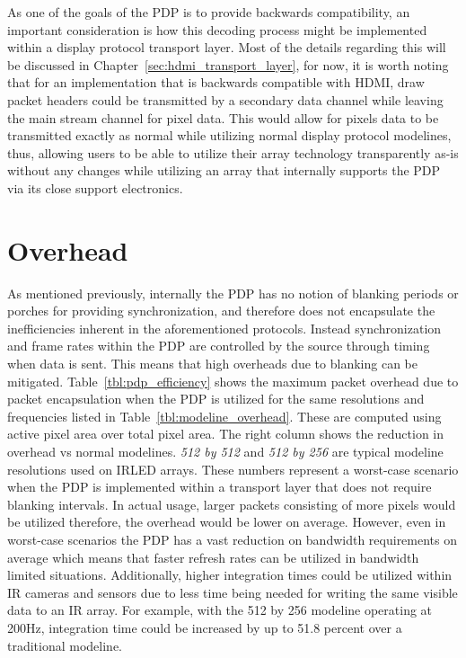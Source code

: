     As one of the goals of the PDP is to provide backwards compatibility, an important consideration is how this decoding process might be implemented within a display protocol transport layer. Most of the details regarding this will be discussed in Chapter~\ref{sec:hdmi_transport_layer}, for now, it is worth noting that for an implementation that is backwards compatible with HDMI, draw packet headers could be transmitted by a secondary data channel while leaving the main stream channel for pixel data. This would allow for pixels data to be transmitted exactly as normal while utilizing normal display protocol modelines, thus, allowing users to be able to utilize their array technology transparently as-is without any changes while utilizing an array that internally supports the PDP via its close support electronics.

\section{Overhead}
    As mentioned previously, internally the PDP has no notion of blanking periods or porches for providing synchronization, and therefore does not encapsulate the inefficiencies inherent in the aforementioned protocols. Instead synchronization and frame rates within the PDP are controlled by the source through timing when data is sent. This means that high overheads due to blanking can be mitigated. Table~\ref{tbl:pdp_efficiency} shows the maximum packet overhead due to packet encapsulation when the PDP is utilized for the same resolutions and frequencies listed in Table~\ref{tbl:modeline_overhead}. These are computed using active pixel area over total pixel area. The right column shows the reduction in overhead vs normal modelines. {\it 512 by 512} and {\it 512 by 256} are typical modeline resolutions used on IRLED arrays. These numbers represent a worst-case scenario when the PDP is implemented within a transport layer that does not require blanking intervals. In actual usage, larger packets consisting of more pixels would be utilized therefore, the overhead would be lower on average. However, even in worst-case scenarios the PDP has a vast reduction on bandwidth requirements on average which means that faster refresh rates can be utilized in bandwidth limited situations. Additionally, higher integration times could be utilized within IR cameras and sensors due to less time being needed for writing the same visible data to an IR array. For example, with the 512 by 256 modeline operating at 200Hz, integration time could be increased by up to 51.8 percent over a traditional modeline.

